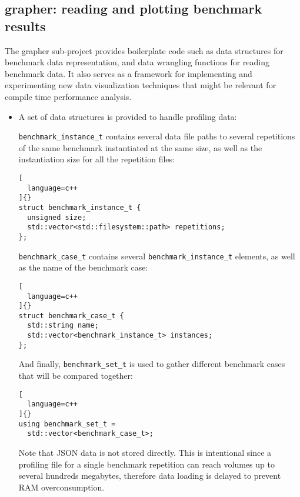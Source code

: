 \documentclass[../main]{subfiles}
\begin{document}
\subsection{
  grapher: reading and plotting benchmark results
}

The grapher sub-project provides boilerplate code such as data structures
for benchmark data representation, and data wrangling functions for reading
benchmark data. It also serves as a framework for implementing and experimenting
new data visualization techniques that might be relevant for compile time
performance analysis.

\begin{itemize}
\item

  A set of data structures is provided to handle profiling data:

  \lstinline{benchmark_instance_t} contains several data file paths to several
  repetitions of the same benchmark instantiated at the same size, as well
  as the instantiation size for all the repetition files:

\begin{lstlisting}[
  language=c++
]{}
struct benchmark_instance_t {
  unsigned size;
  std::vector<std::filesystem::path> repetitions;
};
\end{lstlisting}

\clearpage%

  \lstinline{benchmark_case_t} contains several \lstinline{benchmark_instance_t}
  elements, as well as the name of the benchmark case:

\begin{lstlisting}[
  language=c++
]{}
struct benchmark_case_t {
  std::string name;
  std::vector<benchmark_instance_t> instances;
};
\end{lstlisting}

  And finally, \lstinline{benchmark_set_t} is used to gather
  different benchmark cases that will be compared together:

\begin{lstlisting}[
  language=c++
]{}
using benchmark_set_t =
  std::vector<benchmark_case_t>;
\end{lstlisting}

  Note that JSON data is not stored directly.
  This is intentional since a profiling file for a single benchmark repetition
  can reach volumes up to several hundreds megabytes, therefore data loading
  is delayed to prevent RAM overconsumption.


\end{itemize}
\end{document}
